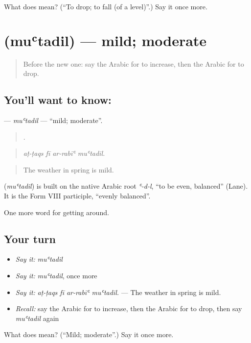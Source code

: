 \begin{tcolorbox}[breakable,colback=teal!4,colframe=teal!35!black,title={Before you move on}]
What does  mean? (\textquotedblleft{}To drop; to fall (of a level)\textquotedblright{}.) Say it once more.
\end{tcolorbox}
\section[\texorpdfstring{\ar{معتدل} (muʿtadil)}{معتدل (muʿtadil)}]{ (muʿtadil) — mild; moderate}

\label{lesson:AR-C480-mutadil}



\begin{quote}
Before the new one: say the Arabic for to increase, then the Arabic for to drop.
\end{quote}

\subsection*{You'll want to know: }
\textbf{} — \emph{muʿtadil} — \textquotedblleft{}mild; moderate\textquotedblright{}.

\begin{quote}
   .
\end{quote}

\begin{quote}
\emph{aṭ-ṭaqs fī ar-rabīʿ muʿtadil.}
\end{quote}

\begin{quote}
The weather in spring is mild.
\end{quote}

\begin{cousinweb}
\textbf{} (\emph{muʿtadil}) is built on the native Arabic root \emph{ʿ-d-l}, \textquotedblleft{}to be even, balanced\textquotedblright{} (Lane). It is the Form VIII participle, \textquotedblleft{}evenly balanced\textquotedblright{}.
\end{cousinweb}

\begin{grammarlens}[title={What you've built}]
One more word for getting around.
\end{grammarlens}

\subsection*{Your turn}
\begin{itemize}
\raggedright
  \item \emph{Say it:} \emph{muʿtadil}
  \item \emph{Say it:} \emph{muʿtadil}, once more
  \item \emph{Say it:} \emph{aṭ-ṭaqs fī ar-rabīʿ muʿtadil.} — The weather in spring is mild.
  \item \emph{Recall:} say the Arabic for to increase, then the Arabic for to drop, then say \emph{muʿtadil} again
\end{itemize}

\begin{tcolorbox}[breakable,colback=teal!4,colframe=teal!35!black,title={Before you move on}]
What does  mean? (\textquotedblleft{}Mild; moderate\textquotedblright{}.) Say it once more.
\end{tcolorbox}
